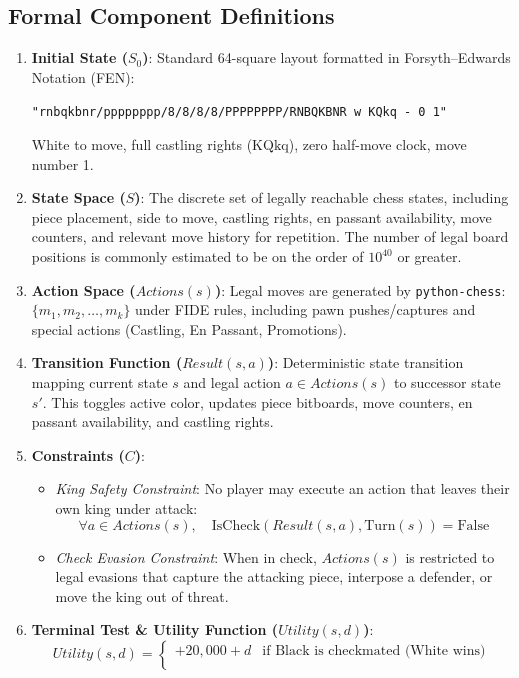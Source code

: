 \documentclass[11pt,a4paper]{article}
\begin{document}
\subsection{Formal Component Definitions}
\begin{enumerate}[leftmargin=*]
    \item \textbf{Initial State ($S_0$)}: Standard 64-square layout formatted in Forsyth--Edwards Notation (FEN):
    \begin{center}
    \texttt{"rnbqkbnr/pppppppp/8/8/8/8/PPPPPPPP/RNBQKBNR w KQkq - 0 1"}
    \end{center}
    White to move, full castling rights ($\text{KQkq}$), zero half-move clock, move number 1.
    \item \textbf{State Space ($S$)}: The discrete set of legally reachable chess states, including piece placement, side to move, castling rights, en passant availability, move counters, and relevant move history for repetition. The number of legal board positions is commonly estimated to be on the order of $10^{40}$ or greater.
    \item \textbf{Action Space ($Actions(s)$)}: Legal moves are generated by \texttt{python-chess}: $\{m_1, m_2, \dots, m_k\}$ under FIDE rules, including pawn pushes/captures and special actions (Castling, En Passant, Promotions).
    \item \textbf{Transition Function ($Result(s,a)$)}: Deterministic state transition mapping current state $s$ and legal action $a \in Actions(s)$ to successor state $s'$. This toggles active color, updates piece bitboards, move counters, en passant availability, and castling rights.
    \item \textbf{Constraints ($C$)}:
    \begin{itemize}
        \item \textit{King Safety Constraint}: No player may execute an action that leaves their own king under attack:
        \[\forall a \in Actions(s),\quad \text{IsCheck}(Result(s,a),\text{Turn}(s))=\text{False}\]
        \item \textit{Check Evasion Constraint}: When in check, $Actions(s)$ is restricted to legal evasions that capture the attacking piece, interpose a defender, or move the king out of threat.
    \end{itemize}
    \item \textbf{Terminal Test \& Utility Function ($Utility(s,d)$)}:
    \[Utility(s,d)=\begin{cases}
    +20,000+d & \text{if Black is checkmated (White wins)}\\

\end{cases}\]
\end{enumerate}
\end{document}
